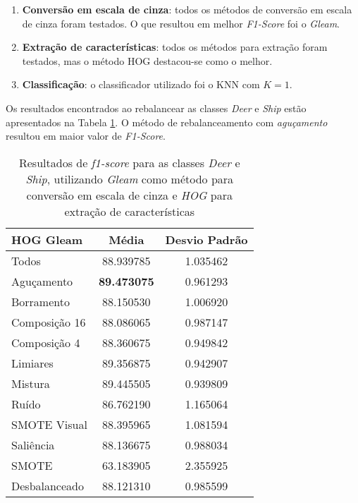 \begin{enumerate}
\item \textbf{Conversão em escala de cinza}: todos os métodos de conversão em escala de cinza foram testados. O que resultou em melhor \textit{F1-Score} foi o \emph{Gleam}.

\item \textbf{Extração de características}: todos os métodos para extração foram testados, mas o método HOG destacou-se como o melhor.

\item \textbf{Classificação}: o classificador utilizado foi o KNN com $K=1$.

\end{enumerate}

Os resultados encontrados ao rebalancear as classes \textit{Deer} e \textit{Ship} estão apresentados na Tabela \ref{tab:resultados:5.1}. O método de rebalanceamento com \emph{aguçamento} resultou em maior valor de \textit{F1-Score}.

\begin{table}[H]
\begin{center}
\caption{Resultados de \textit{f1-score} para as classes \textit{Deer} e \textit{Ship}, utilizando \emph{Gleam} como método para conversão em escala de cinza e \emph{HOG} para extração de características}
\label{tab:resultados:5.1}
\begin{tabular}{|l|c|c|}
\hline
\textbf{HOG Gleam} & \textbf{Média}     & \textbf{Desvio Padrão} \\ \hline
   Todos        &  88.939785 &  1.035462  \\ \hline
  Aguçamento    &  \textbf{89.473075} &  0.961293  \\ \hline
  Borramento    &  88.150530 &  1.006920  \\ \hline
  Composição 16 &  88.086065 &  0.987147  \\ \hline
  Composição 4  &  88.360675 &  0.949842  \\ \hline
  Limiares      &  89.356875 &  0.942907  \\ \hline
  Mistura       &  89.445505 &  0.939809  \\ \hline
  Ruído         &  86.762190 &  1.165064  \\ \hline
  SMOTE Visual  &  88.395965 &  1.081594  \\ \hline
  Saliência     &  88.136675 &  0.988034  \\ \hline
 SMOTE          &  63.183905 &  2.355925  \\ \hline
Desbalanceado   &  88.121310 &  0.985599  \\ \hline
\end{tabular}
\end{center}
\end{table}

